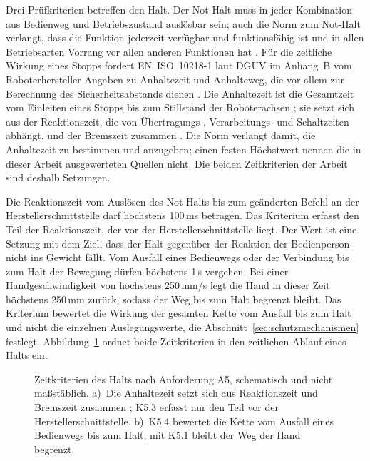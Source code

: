 Drei Prüfkriterien betreffen den Halt.
Der Not-Halt muss in jeder Kombination aus Bedienweg und Betriebszustand auslösbar sein; auch die Norm zum Not-Halt verlangt, dass die Funktion jederzeit verfügbar und funktionsfähig ist und in allen Betriebsarten Vorrang vor allen anderen Funktionen hat \cite{DINENISO13850}. %
Für die zeitliche Wirkung eines Stopps fordert EN~ISO~10218-1 laut DGUV im Anhang~B vom Roboterhersteller Angaben zu Anhaltezeit und Anhalteweg, die vor allem zur Berechnung des Sicherheitsabstands dienen \cite{DGUV2015}.
Die Anhaltezeit ist die Gesamtzeit vom Einleiten eines Stopps bis zum Stillstand der Roboterachsen \cite{DGUV2015}; sie setzt sich aus der Reaktionszeit, die von Übertragungs-, Verarbeitungs- und Schaltzeiten abhängt, und der Bremszeit zusammen \cite{DGUV2015}.
Die Norm verlangt damit, die Anhaltezeit zu bestimmen und anzugeben; einen festen Höchstwert nennen die in dieser Arbeit ausgewerteten Quellen nicht.
Die beiden Zeitkriterien der Arbeit sind deshalb Setzungen.

Die Reaktionszeit vom Auslösen des Not-Halts bis zum geänderten Befehl an der Herstellerschnittstelle darf höchstens 100\,ms betragen. %
Das Kriterium erfasst den Teil der Reaktionszeit, der vor der Herstellerschnittstelle liegt.
Der Wert ist eine Setzung mit dem Ziel, dass der Halt gegenüber der Reaktion der Bedienperson nicht ins Gewicht fällt. 
Vom Ausfall eines Bedienwegs oder der Verbindung bis zum Halt der Bewegung dürfen höchstens 1\,s vergehen. %
Bei einer Handgeschwindigkeit von höchstens 250\,mm/s legt die Hand in dieser Zeit höchstens 250\,mm zurück, sodass der Weg bis zum Halt begrenzt bleibt.
Das Kriterium bewertet die Wirkung der gesamten Kette vom Ausfall bis zum Halt und nicht die einzelnen Auslegungswerte, die Abschnitt~\ref{sec:schutzmechanismen} festlegt.
Abbildung~\ref{fig:schutzzeiten} ordnet beide Zeitkriterien in den zeitlichen Ablauf eines Halts ein.

\begin{figure}[htbp]
  \centering
  
  \caption[Zeitkriterien des Halts nach Anforderung A5]{Zeitkriterien des Halts nach Anforderung A5, schematisch und nicht maßstäblich. a)~Die Anhaltezeit setzt sich aus Reaktionszeit und Bremszeit zusammen \cite{DGUV2015}; K5.3 erfasst nur den Teil vor der Herstellerschnittstelle. b)~K5.4 bewertet die Kette vom Ausfall eines Bedienwegs bis zum Halt; mit K5.1 bleibt der Weg der Hand begrenzt.}
  \label{fig:schutzzeiten}
\end{figure}

